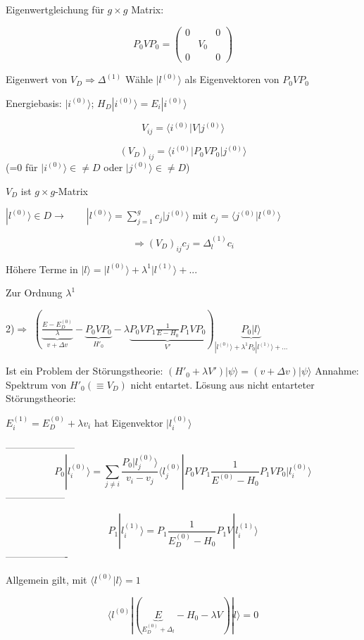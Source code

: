 Eigenwertgleichung für \(g\times g\) Matrix:

\[ P_0 V P_0 = \begin{pmatrix} 0&&0\\ &V_0&\\0&&0 \end{pmatrix} \]

Eigenwert von \(V_D \Rightarrow \Delta^{(1)}\) Wähle \(|l^{(0)}\rangle\) als Eigenvektoren von \(P_0VP_0\)

Energiebasis: \(|i^{(0)}\rangle\); \(H_D|i^{(0)}\rangle=E_i|i^{(0)}\rangle\)

\[ V_{ij} = \langle  i^{(0)}|V|j^{(0)}\rangle \]

\[ (V_D)_{ij} = \langle  i^{(0)}|P_0VP_0|j^{(0)}\rangle \]
(=0 für \(|i^{(0)}\rangle \in\neq D \) oder \(|j^{(0)}\rangle \in\neq D \))

\(V_D\) ist \(g\times g\)-Matrix

\(|l^{(0)}\rangle \in D \rightarrow \qquad |l^{(0)}\rangle=\sum^g_{j=1}c_j|j^{(0)}\rangle \) mit \(c_j=\langle j^{(0)}|l^{(0)}\rangle\)

\[\Rightarrow (V_D)_{ij} c_j = \Delta^{(1)}_l c_i\]

Höhere Terme in \(|l\rangle=|l^{(0)}\rangle+\lambda^1|l^{(1)}\rangle+...\)

Zur Ordnung \(\lambda^1\)

2)\(\Rightarrow\) \((\underbrace{\frac{E-E^{(0)}_D}{\lambda}}_{v+\Delta v}-\underbrace{P_0VP_0}_{H'_0}-\lambda \underbrace{P_0VP_1 \frac{1}{E-H_0}P_1VP_0}_{V'})\underbrace{P_0|l\rangle}_{|l^{(0)}\rangle+\lambda^1P_0|l^{(1)}\rangle+...}\)

Ist ein Problem der Störungstheorie: \((H'_0+\lambda V')|\psi\rangle = (v+\Delta v)|\psi\rangle\) Annahme: Spektrum von \(H'_0(\equiv V_D)\) nicht entartet. Lösung aus nicht entarteter Störungstheorie:

\( E^{(1)}_i = E^{(0)}_D + \lambda v_i\) hat Eigenvektor \(|l^{(0)}_i\rangle\)

---------------------
\[P_0|l^{(0)}_i\rangle = \sum_{j\neq i}\frac{P_0|l^{(0)}_j\rangle}{v_i - v_j}\langle l^{(0)}_j|P_0VP_1\frac{1}{E^{(0)}-H_0}P_1VP_0 |l^{(0)}_i\rangle\]
------------------

\[P_1|l^{(1)}_i\rangle = P_1 \frac{1}{E^{(0)}_D-H_0}P_1 V |l^{(1)}_i\rangle\]
-------------------

Allgemein gilt, mit \(\langle l^{(0)} |l\rangle = 1\)

\[ \langle l^{(0)}|(\underbrace{E}_{E^{(0)}_D+\Delta_l}-H_0-\lambda V) |l\rangle = 0 \]


